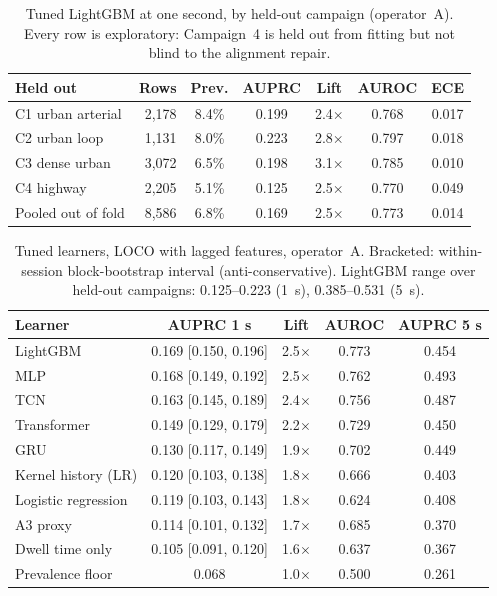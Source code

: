 \documentclass[5p,times,twocolumn]{elsarticle}
\newcommand{\x}{$\times$}
\begin{document}
\begin{table}[t]
\centering
\caption{Tuned LightGBM at one second, by held-out campaign (operator~A). Every row is exploratory: Campaign~4 is held out from fitting but not blind to the alignment repair.}
\label{tab:percamp}
\footnotesize
\setlength{\tabcolsep}{3pt}
\begin{tabularx}{\linewidth}{X r c c c c c}
\toprule
\textbf{Held out} & \textbf{Rows} & \textbf{Prev.} & \textbf{AUPRC} & \textbf{Lift} & \textbf{AUROC} & \textbf{ECE} \\
\midrule
C1 urban arterial & 2,178 & 8.4\% & 0.199 & 2.4\x & 0.768 & 0.017 \\
C2 urban loop & 1,131 & 8.0\% & 0.223 & 2.8\x & 0.797 & 0.018 \\
C3 dense urban & 3,072 & 6.5\% & 0.198 & 3.1\x & 0.785 & 0.010 \\
C4 highway & 2,205 & 5.1\% & 0.125 & 2.5\x & 0.770 & 0.049 \\
Pooled out of fold & 8,586 & 6.8\% & 0.169 & 2.5\x & 0.773 & 0.014 \\
\bottomrule
\end{tabularx}
\end{table}

\begin{table}[t]
\centering
\caption{Tuned learners, LOCO with lagged features, operator~A. Bracketed: within-session block-bootstrap interval (anti-conservative). LightGBM range over held-out campaigns: 0.125--0.223 (1~s), 0.385--0.531 (5~s).}
\label{tab:level}
\footnotesize
\setlength{\tabcolsep}{2.5pt}
\begin{tabularx}{\linewidth}{X c c c c}
\toprule
\textbf{Learner} & \textbf{AUPRC 1 s} & \textbf{Lift} & \textbf{AUROC} & \textbf{AUPRC 5 s} \\
\midrule
LightGBM & 0.169 [0.150, 0.196] & 2.5\x & 0.773 & 0.454 \\
MLP & 0.168 [0.149, 0.192] & 2.5\x & 0.762 & 0.493 \\
TCN & 0.163 [0.145, 0.189] & 2.4\x & 0.756 & 0.487 \\
Transformer & 0.149 [0.129, 0.179] & 2.2\x & 0.729 & 0.450 \\
GRU & 0.130 [0.117, 0.149] & 1.9\x & 0.702 & 0.449 \\
Kernel history (LR) & 0.120 [0.103, 0.138] & 1.8\x & 0.666 & 0.403 \\
Logistic regression & 0.119 [0.103, 0.143] & 1.8\x & 0.624 & 0.408 \\
A3 proxy & 0.114 [0.101, 0.132] & 1.7\x & 0.685 & 0.370 \\
Dwell time only & 0.105 [0.091, 0.120] & 1.6\x & 0.637 & 0.367 \\
Prevalence floor & 0.068 & 1.0\x & 0.500 & 0.261 \\
\bottomrule
\end{tabularx}
\end{table}
\end{document}
